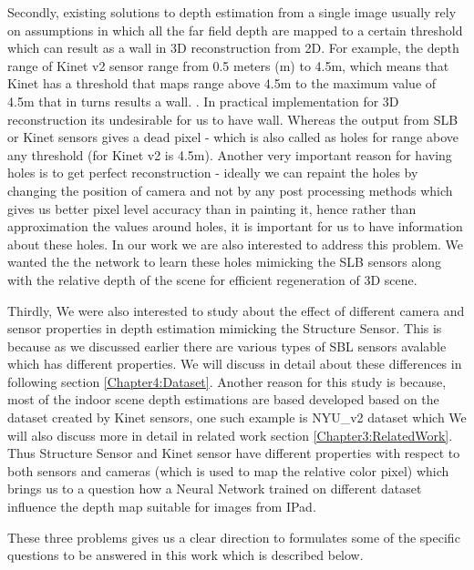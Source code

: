 Secondly, existing solutions to depth estimation from a single image usually rely on assumptions in which all the far field depth are mapped to a certain threshold which can result as a wall in 3D reconstruction from 2D. For example, the depth range of Kinet v2 sensor range from 0.5 meters (m) to 4.5m, which means that Kinet has a threshold that maps range above 4.5m to the maximum value of 4.5m that in turns results a wall. \cite{Silberman:ECCV12} . In practical implementation for 3D reconstruction its undesirable for us to have wall. Whereas the output from SLB or Kinet sensors gives a dead pixel - which is also called as holes for range above any threshold (for Kinet v2 is 4.5m). Another very important reason for having holes is to get perfect reconstruction - ideally we can repaint the holes by changing the position of camera and not by any post processing methods which gives us better pixel level accuracy than in painting it, hence rather than approximation the values around holes, it is important for us to have information about these holes. In our work we are also interested to address this problem. We wanted the the network to learn these holes mimicking the SLB sensors along with the relative depth of the scene for efficient regeneration of 3D scene. 

Thirdly, We were also interested to study about the effect of different camera and sensor properties in depth estimation mimicking the  Structure Sensor. This is because as we discussed earlier there are various types of SBL sensors avalable which has different properties. We will discuss in detail about these differences in following section \ref{Chapter4:Dataset}. Another reason for this study is because, most of the indoor scene depth estimations are based developed based on the dataset created by Kinet sensors, one such example is NYU\_v2 dataset \cite{silberman11indoor} which We will also discuss more in detail in related work section \ref{Chapter3:RelatedWork}. Thus Structure Sensor and Kinet sensor have different properties with respect to both sensors and cameras (which is used to map the relative color pixel) which brings us to a question how a Neural Network trained on different dataset influence the depth map suitable for images from IPad.  

These three problems gives us a clear direction to formulates some of the specific questions to be answered in this work which is described below. 


